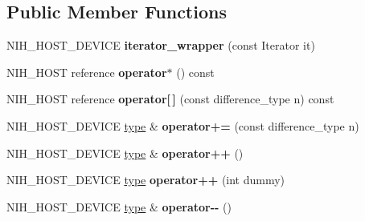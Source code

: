 \subsection*{\-Public \-Member \-Functions}
\begin{DoxyCompactItemize}
\item 
\hypertarget{structnih_1_1iterator__wrapper_a5704040ea328a54d611faf2541c69c59}{
\-N\-I\-H\-\_\-\-H\-O\-S\-T\-\_\-\-D\-E\-V\-I\-C\-E {\bfseries iterator\-\_\-wrapper} (const \-Iterator it)}
\label{structnih_1_1iterator__wrapper_a5704040ea328a54d611faf2541c69c59}

\item 
\hypertarget{structnih_1_1iterator__wrapper_a92b32373555d68c37c61939d670bdda3}{
\-N\-I\-H\-\_\-\-H\-O\-S\-T reference {\bfseries operator$\ast$} () const }
\label{structnih_1_1iterator__wrapper_a92b32373555d68c37c61939d670bdda3}

\item 
\hypertarget{structnih_1_1iterator__wrapper_ac45beeb670184856afe3dc67c43556d7}{
\-N\-I\-H\-\_\-\-H\-O\-S\-T reference {\bfseries operator\mbox{[}$\,$\mbox{]}} (const difference\-\_\-type n) const }
\label{structnih_1_1iterator__wrapper_ac45beeb670184856afe3dc67c43556d7}

\item 
\hypertarget{structnih_1_1iterator__wrapper_acb05421e5fdcb5eb717f70e129c21675}{
\-N\-I\-H\-\_\-\-H\-O\-S\-T\-\_\-\-D\-E\-V\-I\-C\-E \hyperlink{structnih_1_1iterator__wrapper}{type} \& {\bfseries operator+=} (const difference\-\_\-type n)}
\label{structnih_1_1iterator__wrapper_acb05421e5fdcb5eb717f70e129c21675}

\item 
\hypertarget{structnih_1_1iterator__wrapper_a8eb85e4f7ea997097e146e083884f5f2}{
\-N\-I\-H\-\_\-\-H\-O\-S\-T\-\_\-\-D\-E\-V\-I\-C\-E \hyperlink{structnih_1_1iterator__wrapper}{type} \& {\bfseries operator++} ()}
\label{structnih_1_1iterator__wrapper_a8eb85e4f7ea997097e146e083884f5f2}

\item 
\hypertarget{structnih_1_1iterator__wrapper_a61c4355786cc154db0fdd82e73ff038b}{
\-N\-I\-H\-\_\-\-H\-O\-S\-T\-\_\-\-D\-E\-V\-I\-C\-E \hyperlink{structnih_1_1iterator__wrapper}{type} {\bfseries operator++} (int dummy)}
\label{structnih_1_1iterator__wrapper_a61c4355786cc154db0fdd82e73ff038b}

\item 
\hypertarget{structnih_1_1iterator__wrapper_ab2267d997feecba5f6989b28582ba17f}{
\-N\-I\-H\-\_\-\-H\-O\-S\-T\-\_\-\-D\-E\-V\-I\-C\-E \hyperlink{structnih_1_1iterator__wrapper}{type} \& {\bfseries operator-\/-\/} ()}
\label{structnih_1_1iterator__wrapper_ab2267d997feecba5f6989b28582ba17f}


\end{DoxyCompactItemize}
